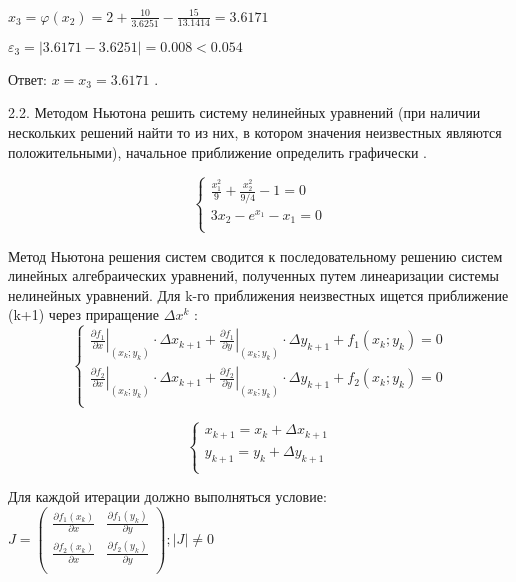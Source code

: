 \documentclass[10pt, a4paper]{scrartcl}
\begin{document}
\(\displaystyle x_3 = \varphi(x_2) = 2 + \frac{10}{3.6251} - \frac{15}{13.1414} = 3.6171\)

\(\displaystyle \varepsilon_3 = |3.6171 - 3.6251| = 0.008 < 0.054\)

Ответ: \(x = x_3 = 3.6171\) .

\pagebreak

2.2. Методом Ньютона решить систему нелинейных уравнений (при наличии
нескольких решений найти то из них, в котором значения неизвестных
являются положительными), начальное приближение определить графически .

\[\left\{\begin{matrix}
\frac{x_1^2}{9} + \frac{x_2^2}{9 / 4} - 1 = 0\\
3x_2 - e^{x_1} - x_1 = 0\\
\end{matrix}\right.\]

Метод Ньютона решения систем сводится к последовательному решению систем
линейных алгебраических уравнений, полученных путем линеаризации системы
нелинейных уравнений. Для k-го приближения неизвестных ищется
приближение (k+1) через приращение \(\Delta x^{k}\) : \[\begin{cases}
\left. \frac{\partial f_1}{\partial x}\right|_{(x_k;y_k)} \cdot \Delta x_{k+1} + \left. \frac{\partial f_1}{\partial y}\right|_{(x_k;y_k)} \cdot \Delta y_{k+1} + f_1(x_k;y_k) = 0\\
\left. \frac{\partial f_2}{\partial x}\right|_{(x_k;y_k)} \cdot \Delta x_{k+1} + \left. \frac{\partial f_2}{\partial y}\right|_{(x_k;y_k)} \cdot \Delta y_{k+1} + f_2(x_k;y_k) = 0\\
\end{cases}\]

\[\begin{cases}
x_{k+1} = x_k + \Delta x_{k+1}\\
y_{k+1} = y_k + \Delta y_{k+1}\\
\end{cases}\]

Для каждой итерации должно выполняться условие:
\(\displaystyle J = \begin{pmatrix} \frac{\partial f_1(x_k)}{\partial x} & \frac{\partial f_1(y_k)}{\partial y}\\ \frac{\partial f_2(x_k)}{\partial x} & \frac{\partial f_2(y_k)}{\partial y}\\ \end{pmatrix}; | J | \neq 0\)
\end{document}
